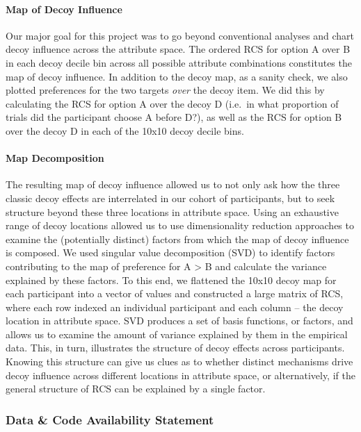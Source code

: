 \documentclass[a4paper, nobind]{templates/ociamthesis}
\begin{document}
\hypertarget{map-of-decoy-influence}{%
\paragraph{Map of Decoy Influence}\label{map-of-decoy-influence}}

Our major goal for this project was to go beyond conventional analyses and chart decoy influence across the attribute space. The ordered RCS for option A over B in each decoy decile bin across all possible attribute combinations constitutes the map of decoy influence. In addition to the decoy map, as a sanity check, we also plotted preferences for the two targets \emph{over} the decoy item. We did this by calculating the RCS for option A over the decoy D (i.e.~in what proportion of trials did the participant choose A before D?), as well as the RCS for option B over the decoy D in each of the 10x10 decoy decile bins.

\hypertarget{map-decomposition}{%
\paragraph{Map Decomposition}\label{map-decomposition}}

The resulting map of decoy influence allowed us to not only ask how the three classic decoy effects are interrelated in our cohort of participants, but to seek structure beyond these three locations in attribute space. Using an exhaustive range of decoy locations allowed us to use dimensionality reduction approaches to examine the (potentially distinct) factors from which the map of decoy influence is composed. We used singular value decomposition (SVD) to identify factors contributing to the map of preference for A \textgreater{} B and calculate the variance explained by these factors. To this end, we flattened the 10x10 decoy map for each participant into a vector of values and constructed a large matrix of RCS, where each row indexed an individual participant and each column -- the decoy location in attribute space. SVD produces a set of basis functions, or factors, and allows us to examine the amount of variance explained by them in the empirical data. This, in turn, illustrates the structure of decoy effects across participants. Knowing this structure can give us clues as to whether distinct mechanisms drive decoy influence across different locations in attribute space, or alternatively, if the general structure of RCS can be explained by a single factor.

\hypertarget{data-code-availability-statement}{%
\subsubsection{Data \& Code Availability Statement}\label{data-code-availability-statement}}
\end{document}

